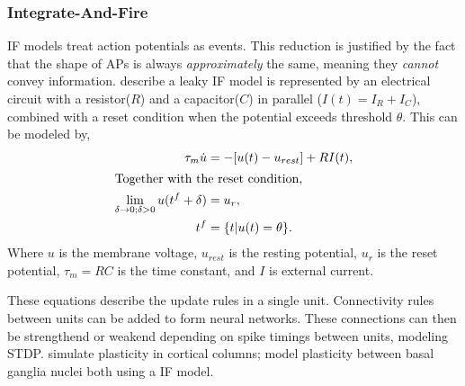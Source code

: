 \subsubsection{Integrate-And-Fire}
IF models treat action potentials as events.
This reduction is justified by the fact that the shape of APs is always \textit{approximately}
the same, meaning they \textit{cannot} convey information. \cite{gerstner2014if} describe a leaky IF model
is represented by an electrical circuit with a resistor($R$) and a capacitor($C$) in parallel
($I(t) = I_R + I_C$), combined with a reset condition when the potential exceeds threshold
$\theta$.
This can be modeled by,
\begin{align}
	\tau_m \dot u                                           & = -[u(t) - u_{rest}] + RI(t),                                    \\
	\intertext{Together with the reset condition,}
	\lim_{\delta \rightarrow 0; \delta > 0} u(t^f + \delta) & = u_r,                                                           \\
	t^f                                                     & = \{t | u(t)                                        = \theta \}.
\end{align}
Where $u$ is the membrane voltage, $u_{rest}$ is the resting potential, $u_r$ is the reset
potential, $\tau_m = RC$ is the time constant, and $I$ is external current.

These equations describe the update rules in a single unit. Connectivity rules between units
can be added to form neural networks. These connections can then be strengthend or weakend
depending on spike timings between units, modeling STDP. \cite{shupe2021integrate} simulate
plasticity in cortical columns; \cite{kromer2023synaptic} model plasticity between basal ganglia
nuclei both using a IF model.

